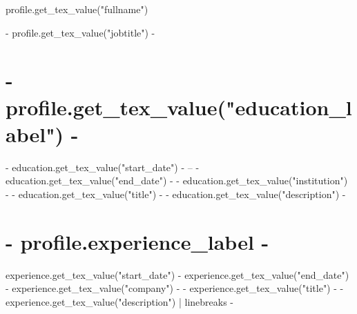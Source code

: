 \documentclass[10pt]{FreemanCV}
\begin{document}
\begin{paracol}{2} %


\parbox[][0.11\textheight][c]{\linewidth}{ %
	\centering %

	{\sffamily\Huge {{ profile.get_tex_value("fullname") }} } %

	\medskip %

	{\cursivefont\Huge\textcolor{headings}{  {{- profile.get_tex_value("jobtitle") -}} }}

	\vfill %
}

{%
\section{ {{- profile.get_tex_value("education_label") -}} }
{%
\jobentry
	{ {{- education.get_tex_value("start_date") -}} -- {{- education.get_tex_value("end_date") -}} }
	{} %
	{ {{- education.get_tex_value("institution") -}} }
	{ {{- education.get_tex_value("title") -}} }
	{ {{- education.get_tex_value("description") -}} }
{%
{%




{%
\section{ {{- profile.experience_label -}} }
{%
\jobentry
	{ {{ experience.get_tex_value("start_date") }} - {{ experience.get_tex_value("end_date") }} } %
	{} %
	{ {{- experience.get_tex_value("company") -}} } %
	{ {{- experience.get_tex_value("title") -}} } %
	{ {{- experience.get_tex_value("description") | linebreaks -}} } %
{%
{%




}}}}}}}}
\end{paracol}
\end{document}
